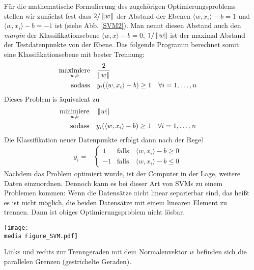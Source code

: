 Für die mathematische Formulierung des zugehörigen Optimierungsproblems stellen wir zunächst fest dass $2/\left\lVert w\right\rVert$ der Abstand der Ebenen $\langle w, x_i\rangle - b = 1$ und $\langle w, x_i\rangle - b = -1$ ist (siehe Abb. \ref{SVM2}). Man nennt diesen Abstand auch den \emph{margin} der Klassifikationsebene $\langle w, x\rangle - b = 0$, $1/\left\lVert w\right\rVert$ ist der maximal Abstand der Testdatenpunkte von der Ebene. Das folgende Programm berechnet somit eine Klassifikationsebene mit bester Trennung:
\begin{align*}
	\underset{w,b}{\operatorname{maximiere}} \quad & \frac{2}{\left\lVert w\right\rVert} \\
	\operatorname{sodass} \quad &y_{i}(\langle w,x_{i} \rangle -b) \geq 1 \quad \forall  i = 1,\dots ,n
\end{align*}
Dieses Problem is äquivalent zu
\begin{align*}
		\underset{w,b}{\operatorname{minimiere}} \quad & \left\lVert w\right\rVert \\
		\operatorname{sodass} \quad &y_{i}(\langle w,x_{i} \rangle -b) \geq 1 \quad \forall i = 1,\dots,n
\end{align*}
Die Klassifikation neuer Datenpunkte erfolgt dann nach der Regel
\begin{align*}
	y_{i} =& 
        \begin{cases}
1 &\text{falls} \quad \langle w,x_{i} \rangle - b \geq 0 \\
-1 &\text{falls} \quad \langle w,x_{i} \rangle - b \leq 0
\end{cases}
\end{align*}
Nachdem das Problem optimiert wurde, ist der Computer in der Lage, weitere Daten einzuordnen.
Dennoch kann es bei dieser Art von SVMs zu einem Problemen kommen: Wenn die Datensätze nicht linear separierbar sind, das heißt es ist nicht möglich, die beiden Datensätze mit einem linearen Element zu trennen. Dann ist obiges Optimierungsproblem nicht lösbar.

\begin{dsafigure}
	\begin{center}
		\texttt{[image: \\media Figure\_SVM.pdf]}
		\caption{Links und rechts zur Trenngeraden mit dem Normalenvektor $w$ befinden sich die parallelen Grenzen (gestrichelte Geraden).}
		\label{SVM2}
	\end{center}
\end{dsafigure}

